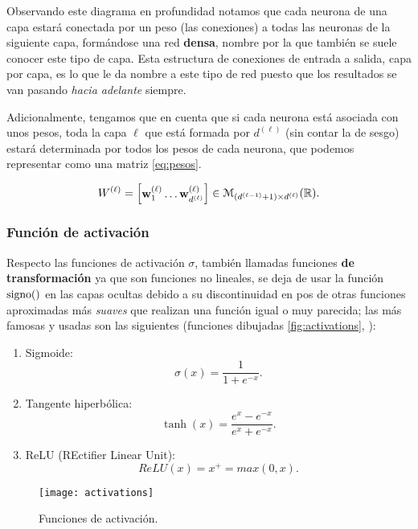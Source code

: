 Observando este diagrama en profundidad notamos que cada neurona de una capa estará conectada por un peso (las conexiones) a todas las neuronas de la siguiente capa, formándose una red \textbf{densa}, nombre por la que también se suele conocer este tipo de capa. Esta estructura de conexiones de entrada a salida, capa por capa, es lo que le da nombre a este tipo de red puesto que los resultados se van pasando \emph{hacia adelante} siempre.

Adicionalmente, tengamos que en cuenta que si cada neurona está asociada con unos pesos, toda la capa $\ell$ que está formada por $d^{(\ell)}$ (sin contar la de sesgo) estará determinada por todos los pesos de cada neurona, que podemos representar como una matriz \eqref{eq:pesos}.

\begin{equation}
  W^{(\ell)} = \begin{bmatrix} \textbf{w}^{(\ell)}_{1} \ldots \textbf{w}^{(\ell)}_{d^{(\ell)}} \end{bmatrix} \in \mathcal{M}_{(d^{(\ell - 1)} + 1) \times d^{(\ell)}}(\mathbb{R}).
  \label{eq:pesos}
\end{equation}

\subsubsection{Función de activación}

Respecto las funciones de activación $\sigma$, también llamadas funciones \textbf{de transformación} ya que son funciones no lineales, se deja de usar la función $\operatorname{signo}()$ en las capas ocultas debido a su discontinuidad en pos de otras funciones aproximadas más \emph{suaves} que realizan una función igual o muy parecida; las más famosas y usadas son las siguientes (funciones dibujadas \autoref{fig:activations}, \cite{moujahid2016activations}):

\begin{enumerate}
  \item Sigmoide: $$\sigma(x) = \dfrac{1}{1 + e^{-x}}.$$
  \item Tangente hiperbólica: $$\tanh(x) = \dfrac{e^x-e^{-x}}{e^{x}+e^{-x}}.$$
  \item ReLU (REctifier Linear Unit): $$ReLU(x) = x^+ = max(0, x).$$
\end{enumerate}

\begin{figure}[htpb]
  \centering
  \texttt{[image: activations]}
  \caption{Funciones de activación.}
  \label{fig:activations}
\end{figure}

